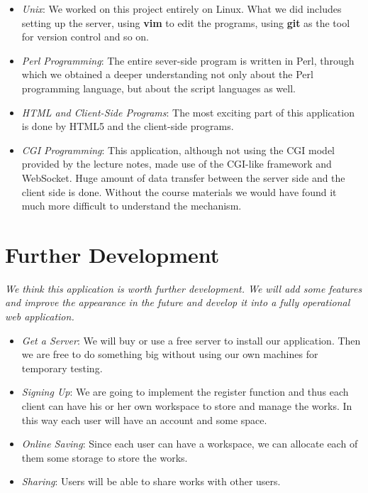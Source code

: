 \documentclass[a4paper,11pt,3p]{article}
\begin{document}
\begin{itemize}
\item
\emph{Unix}: We worked on this project entirely on Linux. What we did includes setting up the 
server, using \textbf{vim} to edit the programs, using \textbf{git} as the tool for version 
control and so on.\\

\item
\emph{Perl Programming}: The entire sever-side program is written in Perl, through which we 
obtained a deeper understanding not only about the Perl programming language, but about the 
script languages as well.\\

\item
\emph{HTML and Client-Side Programs}: The most exciting part of this application is done by 
HTML5 and the client-side programs.\\

\item
\emph{CGI Programming}: This application, although not using the CGI model provided by the 
lecture notes, made use of the CGI-like framework and WebSocket. Huge amount of data transfer between the 
server side and the client side is done. Without the course materials we would have found it 
much more difficult to understand the mechanism.\\
\end{itemize}

\section{Further Development}
\emph{We think this application is worth further development. We will add some features and 
improve the appearance in the future and develop it into a fully operational web application.}\\

\begin{itemize}
\item
\emph{Get a Server}: We will buy or use a free server to install our application. Then we are free 
to do something big without using our own machines for temporary testing.\\

\item
\emph{Signing Up}: We are going to implement the register function and thus each client can have 
his or her own workspace to store and manage the works. In this way each user will have an account 
and some space.\\

\item
\emph{Online Saving}: Since each user can have a workspace, we can allocate each of them some storage 
to store the works.\\

\item
\emph{Sharing}: Users will be able to share works with other users.\\
\end{itemize}
\end{document}
